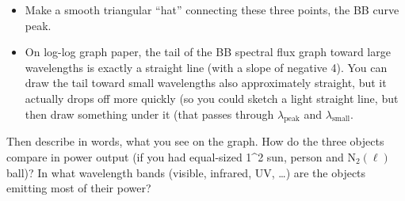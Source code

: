 \documentclass[12pt]{article}
\begin{document}
\begin{enumerate}
\begin{table}[t]
{{\begin{itemize}
	\item Make a smooth triangular ``hat''  connecting these three points,  the BB curve peak.
	\item On log-log graph paper, the tail of the BB spectral flux graph toward large wavelengths is exactly a straight line (with a slope of negative 4). You can draw the tail toward small wavelengths also approximately straight, but it actually drops off more quickly (so you could sketch a light straight line, but then draw something under it (that passes through $\lambda_\text{peak}$ and $\lambda_\text{small}$.
	\end{itemize}
	}%
	}
	\caption{ \label{table:rules-for-BB-curves}
	Rules of thumb for drawing blackbody curves
	}
	\end{table}
Then describe in words, what you see on the graph.  How do the three objects compare in power output (if you had equal-sized \unit{1}{\meter^2} sun, person and $\text{N}_2(\ell)$ ball)? In what wavelength bands (visible, infrared, UV, \ldots) are the objects emitting most of their power?



\end{enumerate}
\end{document}
